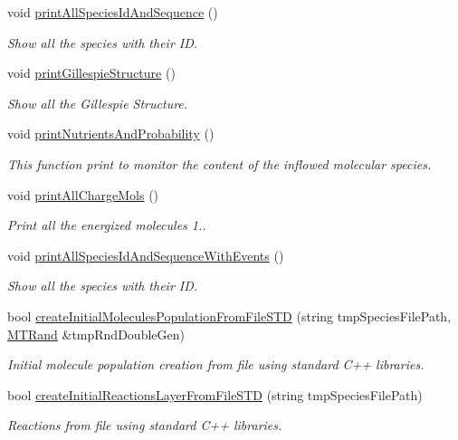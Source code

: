 \begin{DoxyCompactItemize}
void \hyperlink{a00011_a48d8fd9d8d5c9c31f0b4af87c8cbd28f}{print\-All\-Species\-Id\-And\-Sequence} ()
\begin{DoxyCompactList}\small\item\em Show all the species with their I\-D. \end{DoxyCompactList}\item 
void \hyperlink{a00011_aa3a18c59f6127c642603a98c1b3a2224}{print\-Gillespie\-Structure} ()
\begin{DoxyCompactList}\small\item\em Show all the Gillespie Structure. \end{DoxyCompactList}\item 
void \hyperlink{a00011_ad8fcefe5325382fb307627c7e8362ba8}{print\-Nutrients\-And\-Probability} ()
\begin{DoxyCompactList}\small\item\em This function print to monitor the content of the inflowed molecular species. \end{DoxyCompactList}\item 
void \hyperlink{a00011_af579052ed051a2e3516218220d238303}{print\-All\-Charge\-Mols} ()
\begin{DoxyCompactList}\small\item\em Print all the energized molecules  1.. \end{DoxyCompactList}\item 
void \hyperlink{a00011_a3beddfc55f70a9cc855c3e3caaa7f188}{print\-All\-Species\-Id\-And\-Sequence\-With\-Events} ()
\begin{DoxyCompactList}\small\item\em Show all the species with their I\-D. \end{DoxyCompactList}\item 
bool \hyperlink{a00011_af6db92c710f2588ba7dff1165e26d538}{create\-Initial\-Molecules\-Population\-From\-File\-S\-T\-D} (string tmp\-Species\-File\-Path, \hyperlink{a00016}{M\-T\-Rand} \&tmp\-Rnd\-Double\-Gen)
\begin{DoxyCompactList}\small\item\em Initial molecule population creation from file using standard C++ libraries. \end{DoxyCompactList}\item 
bool \hyperlink{a00011_a2f181e0d3ad1e8062ba0a8c9358ebc58}{create\-Initial\-Reactions\-Layer\-From\-File\-S\-T\-D} (string tmp\-Species\-File\-Path)
\begin{DoxyCompactList}\small\item\em Reactions from file using standard C++ libraries. \end{DoxyCompactList}\item 

\end{DoxyCompactItemize}
